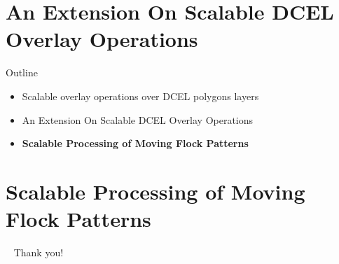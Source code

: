 \documentclass{beamer}
\begin{document}
    \section{An Extension On Scalable DCEL Overlay Operations}



    \begin{frame}{Outline}
        \begin{itemize}
                \item Scalable overlay operations over DCEL polygons layers
                \item An Extension On Scalable DCEL Overlay Operations
                \item \textbf{Scalable Processing of Moving Flock Patterns}
        \end{itemize}
    \end{frame}

    \section{Scalable Processing of Moving Flock Patterns}

    


    \begin{frame}{ \ }
        \LARGE Thank you!
    \end{frame}
\end{document}
